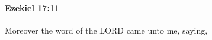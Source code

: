 
		\paragraph{Ezekiel 17:11} %
			\label{EZEKIEL-17-11}

			Moreover the word of the LORD came unto me, saying,


